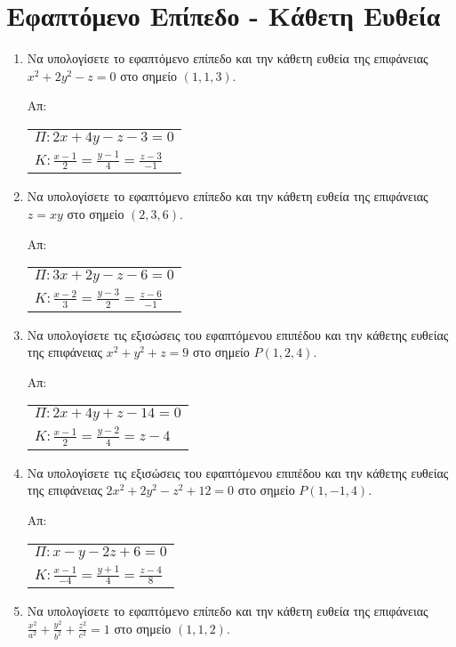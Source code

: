 \section*{Εφαπτόμενο Επίπεδο - Κάθετη Ευθεία}

\begin{enumerate}
  \item Να υπολογίσετε το εφαπτόμενο επίπεδο και την κάθετη ευθεία της επιφάνειας 
    $ x^{2}+2y^{2}-z = 0 $ στο σημείο $ (1,1,3) $.

    \hfill Απ: \begin{tabular}{l}
      $ \Pi : 2x+4y-z -3 = 0 $ \\
      $ K : \frac{x-1}{2} = \frac{y-1}{4} = \frac{z-3}{-1} $
    \end{tabular} 

  \item Να υπολογίσετε το εφαπτόμενο επίπεδο και την κάθετη ευθεία της επιφάνειας 
    $ z = xy $ στο σημείο $ (2,3,6) $.

    \hfill Απ: \begin{tabular}{l}
      $ \Pi : 3x+2y-z-6 = 0 $ \\
      $ K : \frac{x-2}{3} = \frac{y-3}{2} = \frac{z-6}{-1} $
    \end{tabular} 

  \item Να υπολογίσετε τις εξισώσεις του εφαπτόμενου επιπέδου και την κάθετης ευθείας 
    της επιφάνειας $ x^{2} + y^{2} + z = 9 $ στο σημείο $ P(1,2,4) $.

    \hfill Απ: \begin{tabular}{l}
      $ \Pi : 2x+4y+z-14=0 $ \\
      $ K : \frac{x-1}{2} = \frac{y-2}{4} = z-4 $
    \end{tabular} 

  \item Να υπολογίσετε τις εξισώσεις του εφαπτόμενου επιπέδου και την κάθετης ευθείας 
    της επιφάνειας $ 2x^{2} + 2y^{2} - z^{2} +12=0 $ στο σημείο $ P(1,-1,4) $.

    \hfill Απ: \begin{tabular}{l}
      $ \Pi : x-y-2z+6=0 $ \\
      $ K : \frac{x-1}{-4} = \frac{y+1}{4} = \frac{z-4}{8} $
    \end{tabular} 

  \item Να υπολογίσετε το εφαπτόμενο επίπεδο και την κάθετη ευθεία της επιφάνειας 
    $ \frac{x^{2}}{a^{2}} + \frac{y^{2}}{b^{2}} + \frac{z^{2}}{c^{2}} = 1  $ στο σημείο 
    $ (1,1,2) $.


\end{enumerate}
